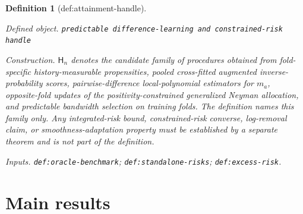 \documentclass{article}
\newtheorem{definition}{Definition}
\begin{document}
\begin{definition}[def:attainment-handle]\label{def:attainment-handle}
\par\smallskip\noindent\emph{Defined object.} \texttt{predictable difference-\allowbreak{}learning and constrained-\allowbreak{}risk handle}
\par\smallskip\noindent\emph{Construction.} \(\mathsf H_n\) denotes the candidate family of procedures obtained from fold-specific history-measurable propensities, pooled cross-fitted augmented inverse-probability scores, pairwise-difference local-polynomial estimators for \(m_a\), opposite-fold updates of the positivity-constrained generalized Neyman allocation, and predictable bandwidth selection on training folds.  The definition names this family only.  Any integrated-risk bound, constrained-risk converse, log-removal claim, or smoothness-adaptation property must be established by a separate theorem and is not part of the definition.
\par\smallskip\noindent\emph{Inputs.} \texttt{def:\allowbreak{}oracle-\allowbreak{}benchmark}; \texttt{def:\allowbreak{}standalone-\allowbreak{}risks}; \texttt{def:\allowbreak{}excess-\allowbreak{}risk}.
\end{definition}

\section{Main results}
\end{document}

